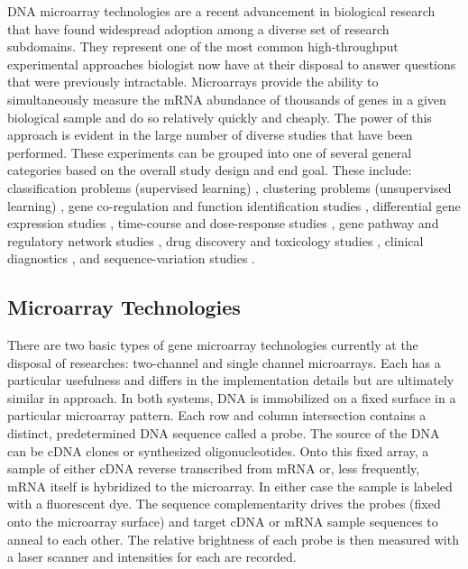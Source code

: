 {DNA microarray technologies are a recent advancement in biological research
that have found widespread adoption among a diverse set of research subdomains.
They represent one of the most common high-throughput experimental approaches
biologist now have at their disposal to answer questions that were previously
intractable. Microarrays provide the ability to simultaneously measure the mRNA
abundance of thousands of genes in a given biological sample and do so
relatively quickly and cheaply.  The power of this approach is evident in the
large number of diverse studies that have been performed.  These experiments
can be grouped into one of several general categories based on the overall
study design and end goal.  These include: classification problems (supervised
learning) \cite{Dudoit2003ICM}, clustering problems (unsupervised learning)
\cite{Azuaje2003cge,Stanford2003cac}, gene co-regulation and function
identification studies \cite{PMID_12413821}, differential gene expression
studies \cite{PMID_15843092,PMID_15867208}, time-course and dose-response
studies \cite{PMID_12443997}, gene pathway and regulatory network studies
\cite{PMID_16216773,PMID_16825123}, drug discovery and toxicology studies
\cite{PMID_16512775,PMID_16700885,PMID_16880944,PMID_17195470}, clinical
diagnostics \cite{PMID_16918486}, and sequence-variation studies
\cite{PMID_17265721}.

\subsection{Microarray Technologies}

There are two basic types of gene microarray technologies currently at the
disposal of researches: two-channel and single channel microarrays.  Each has a
particular usefulness and differs in the implementation details but are
ultimately similar in approach.  In both systems, DNA is immobilized on a fixed
surface in a particular microarray pattern.  Each row and column intersection
contains a distinct, predetermined DNA sequence called a probe. The source of
the DNA can be cDNA clones or synthesized oligonucleotides.  Onto this fixed
array, a sample of either cDNA reverse transcribed from mRNA or, less
frequently, mRNA itself is hybridized to the microarray.  In either case the sample
is labeled with a fluorescent dye.  The sequence complementarity drives the
probes (fixed onto the microarray surface) and target cDNA or mRNA sample sequences
to anneal to each other.  The relative brightness of each probe is then
measured with a laser scanner and intensities for each are recorded.

}
